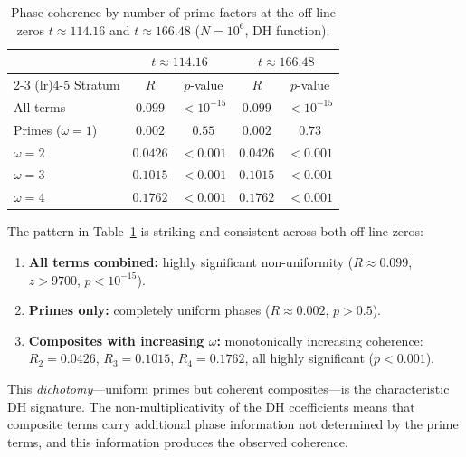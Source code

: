 \documentclass[11pt]{amsart}
\theoremstyle{definition}
\theoremstyle{remark}
\begin{document}
\begin{table}[ht]
\centering
\caption{Phase coherence by number of prime factors at the
  off-line zeros $t \approx 114.16$ and $t \approx 166.48$
  ($N = 10^6$, DH function).}
\label{tab:composite-coherence}
\begin{tabular}{@{}lcccc@{}}
\toprule
 & \multicolumn{2}{c}{$t \approx 114.16$} &
   \multicolumn{2}{c}{$t \approx 166.48$} \\
\cmidrule(lr){2-3} \cmidrule(lr){4-5}
Stratum & $R$ & $p$-value & $R$ & $p$-value \\
\midrule
All terms         & $0.099$ & $< 10^{-15}$ &
                    $0.099$ & $< 10^{-15}$ \\
Primes ($\omega=1$) & $0.002$ & $0.55$ &
                      $0.002$ & $0.73$ \\
$\omega = 2$      & $0.0426$ & $< 0.001$ &
                     $0.0426$ & $< 0.001$ \\
$\omega = 3$      & $0.1015$ & $< 0.001$ &
                     $0.1015$ & $< 0.001$ \\
$\omega = 4$      & $0.1762$ & $< 0.001$ &
                     $0.1762$ & $< 0.001$ \\
\bottomrule
\end{tabular}
\end{table}

The pattern in Table~\ref{tab:composite-coherence} is striking and
consistent across both off-line zeros:

\begin{enumerate}
\item \textbf{All terms combined:} highly significant non-uniformity
  ($R \approx 0.099$, $z > 9700$, $p < 10^{-15}$).

\item \textbf{Primes only:} completely uniform phases
  ($R \approx 0.002$, $p > 0.5$).

\item \textbf{Composites with increasing $\omega$:} monotonically
  increasing coherence: $R_2 = 0.0426$, $R_3 = 0.1015$,
  $R_4 = 0.1762$, all highly significant ($p < 0.001$).
\end{enumerate}

This \emph{dichotomy}---uniform primes but coherent composites---is
the characteristic DH signature.  The non-multiplicativity of the DH
coefficients means that composite terms carry additional phase
information not determined by the prime terms, and this information
produces the observed coherence.
\end{document}
